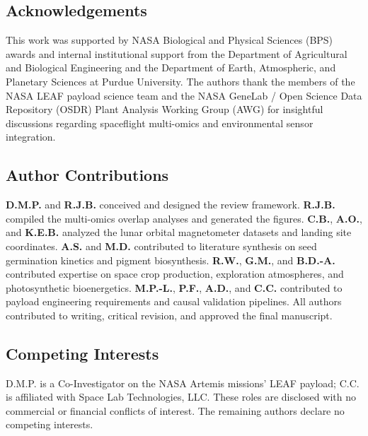 \documentclass[default,sn-nature,iicol]{sn-jnl}
\begin{document}
\subsection*{Acknowledgements}
This work was supported by NASA Biological and Physical Sciences (BPS) awards and internal institutional support from the Department of Agricultural and Biological Engineering and the Department of Earth, Atmospheric, and Planetary Sciences at Purdue University. The authors thank the members of the NASA LEAF payload science team and the NASA GeneLab / Open Science Data Repository (OSDR) Plant Analysis Working Group (AWG) for insightful discussions regarding spaceflight multi-omics and environmental sensor integration.

\subsection*{Author Contributions}
\textbf{D.M.P.} and \textbf{R.J.B.} conceived and designed the review framework. \textbf{R.J.B.} compiled the multi-omics overlap analyses and generated the figures. \textbf{C.B.}, \textbf{A.O.}, and \textbf{K.E.B.} analyzed the lunar orbital magnetometer datasets and landing site coordinates. \textbf{A.S.} and \textbf{M.D.} contributed to literature synthesis on seed germination kinetics and pigment biosynthesis. \textbf{R.W.}, \textbf{G.M.}, and \textbf{B.D.-A.} contributed expertise on space crop production, exploration atmospheres, and photosynthetic bioenergetics. \textbf{M.P.-L.}, \textbf{P.F.}, \textbf{A.D.}, and \textbf{C.C.} contributed to payload engineering requirements and causal validation pipelines. All authors contributed to writing, critical revision, and approved the final manuscript.

\subsection*{Competing Interests}
D.M.P. is a Co-Investigator on the NASA Artemis missions' LEAF payload; C.C. is affiliated with Space Lab Technologies, LLC. These roles are disclosed with no commercial or financial conflicts of interest. The remaining authors declare no competing interests.


\end{document}
